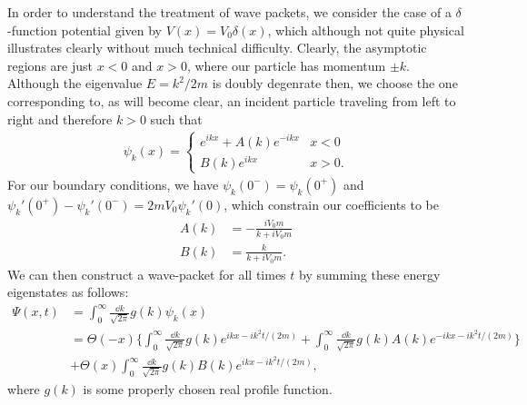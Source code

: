 In order to understand the treatment of wave packets, we consider the case of a $\delta$-function potential given by $V(x) = V_0 \delta(x)$, which although not quite physical illustrates clearly without much technical difficulty.
Clearly, the asymptotic regions are just $x < 0$ and $x > 0$, where our particle has momentum $\pm k$.
Although the eigenvalue $E = k^2/2m$ is doubly degenrate then, we choose the one corresponding to, as will become clear, an incident particle traveling from left to right and therefore $k > 0$ such that
\begin{align}
    \psi_{k}(x) = 
    \begin{cases}
        e^{i k x} + A(k) e^{-i k x} & x < 0 \\
        B(k) e^{i k x} & x > 0
    .\end{cases}
\end{align}
For our boundary conditions, we have $\psi_{k}(0^{-}) = \psi_{k}(0^{+})$ and $\psi_{k}'(0^{+}) - \psi_{k}'(0^{-}) = 2 m V_0 \psi_{k}'(0)$, which constrain our coefficients to be
\begin{align}
    A(k) &= -\frac{i V_0 m}{k + i V_0 m} \\
    B(k) &= \frac{k}{k + i V_0 m}
.\end{align}
We can then construct a wave-packet for all times $t$ by summing these energy eigenstates as follows:
\begin{align}
    \Psi(x,t) &= \int_{0}^{\infty} \frac{\dd{k}}{\sqrt{2 \pi}} g(k) \psi_{k}(x) \nonumber \\
              &= \Theta(-x) \Bigg\{ \int_{0}^{\infty} \frac{\dd{k}}{\sqrt{2 \pi}} g(k) e^{i k x - i k^2 t / (2m)} + \int_{0}^{\infty} \frac{\dd{k}}{\sqrt{2 \pi}} g(k) A(k) e^{-i k x - i k^2 t / (2m)} \Bigg\} \nonumber \\
              &+ \Theta(x) \int_{0}^{\infty} \frac{\dd{k}}{\sqrt{2 \pi}} g(k) B(k) e^{i k x - i k^2 t / (2m)}
,\end{align}
where $g(k)$ is some properly chosen real profile function.

